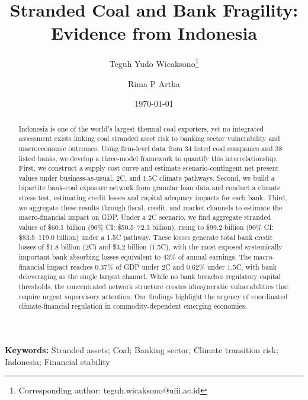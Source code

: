 \documentclass[12pt, a4paper]{article}
\begin{document}
\title{Stranded Coal and Bank Fragility: Evidence from Indonesia}

\author[1]{Teguh Yudo Wicaksono\thanks{Corresponding author: teguh.wicaksono@uiii.ac.id}}
\author[1]{Rima P Artha}



\date{\today}

\maketitle

\begin{abstract}
Indonesia is one of the world's largest thermal coal exporters, yet no integrated assessment exists linking coal stranded asset risk to banking sector vulnerability and macroeconomic outcomes. Using firm-level data from 34 listed coal companies and 38 listed banks, we develop a three-model framework to quantify this interrelationship. First, we construct a supply cost curve and estimate scenario-contingent net present values under business-as-usual, 2\textdegree C, and 1.5\textdegree C climate pathways. Second, we build a bipartite bank-coal exposure network from granular loan data and conduct a climate stress test, estimating credit losses and capital adequacy impacts for each bank. Third, we aggregate these results through fiscal, credit, and market channels to estimate the macro-financial impact on GDP. Under a 2\textdegree C scenario, we find aggregate stranded values of \$60.1 billion (90\% CI: \$50.5--72.3 billion), rising to \$99.2 billion (90\% CI: \$83.5--119.0 billion) under a 1.5\textdegree C pathway. These losses generate total bank credit losses of \$1.8 billion (2\textdegree C) and \$3.2 billion (1.5\textdegree C), with the most exposed systemically important bank absorbing losses equivalent to 43\% of annual earnings. The macro-financial impact reaches 0.37\% of GDP under 2\textdegree C and 0.62\% under 1.5\textdegree C, with bank deleveraging as the single largest channel. While no bank breaches regulatory capital thresholds, the concentrated network structure creates idiosyncratic vulnerabilities that require urgent supervisory attention. Our findings highlight the urgency of coordinated climate-financial regulation in commodity-dependent emerging economies.
\end{abstract}

\medskip
\noindent\textbf{Keywords:} Stranded assets; Coal; Banking sector; Climate transition risk; Indonesia; Financial stability
\end{document}
